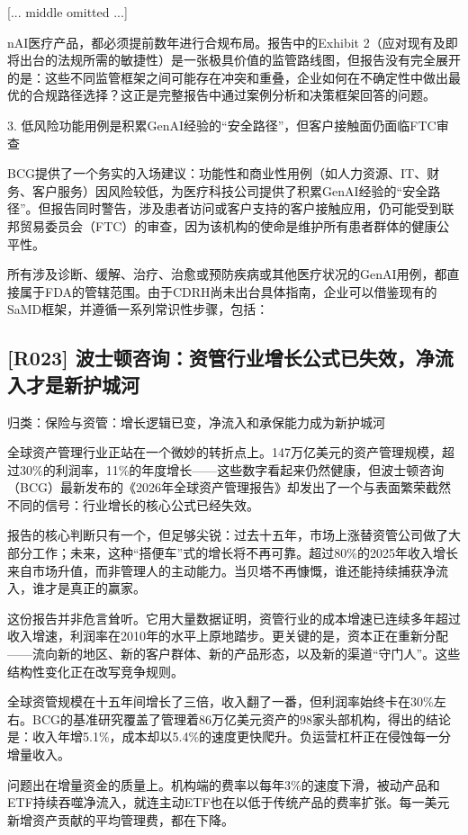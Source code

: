 \documentclass[11pt]{ctexart}
\begin{document}
[... middle omitted ...]

nAI医疗产品，都必须提前数年进行合规布局。报告中的Exhibit 2（应对现有及即将出台的法规所需的敏捷性）是一张极具价值的监管路线图，但报告没有完全展开的是：这些不同监管框架之间可能存在冲突和重叠，企业如何在不确定性中做出最优的合规路径选择？这正是完整报告中通过案例分析和决策框架回答的问题。

3. 低风险功能用例是积累GenAI经验的“安全路径”，但客户接触面仍面临FTC审查

BCG提供了一个务实的入场建议：功能性和商业性用例（如人力资源、IT、财务、客户服务）因风险较低，为医疗科技公司提供了积累GenAI经验的“安全路径”。但报告同时警告，涉及患者访问或客户支持的客户接触应用，仍可能受到联邦贸易委员会（FTC）的审查，因为该机构的使命是维护所有患者群体的健康公平性。

所有涉及诊断、缓解、治疗、治愈或预防疾病或其他医疗状况的GenAI用例，都直接属于FDA的管辖范围。由于CDRH尚未出台具体指南，企业可以借鉴现有的SaMD框架，并遵循一系列常识性步骤，包括：

\subsection{[R023] 波士顿咨询：资管行业增长公式已失效，净流入才是新护城河}
{\small\color{refgray}归类：保险与资管：增长逻辑已变，净流入和承保能力成为新护城河}

全球资产管理行业正站在一个微妙的转折点上。147万亿美元的资产管理规模，超过30\%的利润率，11\%的年度增长——这些数字看起来仍然健康，但波士顿咨询（BCG）最新发布的《2026年全球资产管理报告》却发出了一个与表面繁荣截然不同的信号：行业增长的核心公式已经失效。

报告的核心判断只有一个，但足够尖锐：过去十五年，市场上涨替资管公司做了大部分工作；未来，这种“搭便车”式的增长将不再可靠。超过80\%的2025年收入增长来自市场升值，而非管理人的主动能力。当贝塔不再慷慨，谁还能持续捕获净流入，谁才是真正的赢家。

这份报告并非危言耸听。它用大量数据证明，资管行业的成本增速已连续多年超过收入增速，利润率在2010年的水平上原地踏步。更关键的是，资本正在重新分配——流向新的地区、新的客户群体、新的产品形态，以及新的渠道“守门人”。这些结构性变化正在改写竞争规则。

全球资管规模在十五年间增长了三倍，收入翻了一番，但利润率始终卡在30\%左右。BCG的基准研究覆盖了管理着86万亿美元资产的98家头部机构，得出的结论是：收入年增5.1\%，成本却以5.4\%的速度更快爬升。负运营杠杆正在侵蚀每一分增量收入。

问题出在增量资金的质量上。机构端的费率以每年3\%的速度下滑，被动产品和ETF持续吞噬净流入，就连主动ETF也在以低于传统产品的费率扩张。每一美元新增资产贡献的平均管理费，都在下降。
\end{document}
